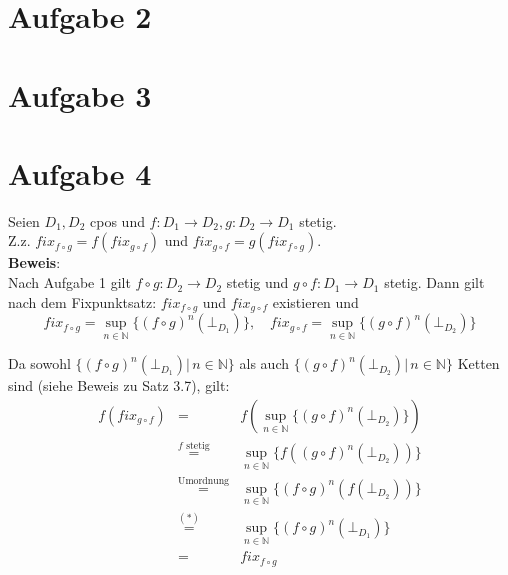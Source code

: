 \documentclass[11pt,a4paper,ngerman]{article}
\begin{document}

\section*{Aufgabe 2}



\section*{Aufgabe 3}



\section*{Aufgabe 4}
Seien $D_1, D_2$ cpos und $f: D_1 \to D_2, g: D_2 \to D_1$ stetig.\\
Z.z. $fix_{f\circ g} = f(fix_{g\circ f})$ und $fix_{g\circ f} = g(fix_{f\circ g})$.\\

\textbf{Beweis}:\\
Nach Aufgabe 1 gilt $f \circ g : D_2 \to D_2$ stetig und $g \circ f : D_1 \to D_1$ stetig. Dann gilt nach dem Fixpunktsatz: $fix_{f \circ g}$ und $fix_{g \circ f}$ existieren und
$$fix_{f \circ g} = \sup_{n \in \mathbb{N}} \{(f \circ g)^n(\bot_{D_1}) \}, \quad fix_{g \circ f} = \sup_{n \in \mathbb{N}} \{(g \circ f)^n(\bot_{D_2}) \}$$

Da sowohl $\{(f \circ g)^n(\bot_{D_1}) |\, n\in \mathbb{N}\}$ als auch $\{(g \circ f)^n(\bot_{D_2}) |\, n\in \mathbb{N}\}$ Ketten sind (siehe Beweis zu Satz 3.7), gilt:\\

\begin{eqnarray*}
f (fix_{g \circ f}) &=& f(\sup_{n \in \mathbb{N}} \{(g \circ f)^n(\bot_{D_2}) \}) \\
&\stackrel{f \text{ stetig}}{=}& \sup_{n \in \mathbb{N}} \{f((g \circ f)^n(\bot_{D_2})) \}\\
&\stackrel{\text{Umordnung}}{=}& \sup_{n \in \mathbb{N}} \{(f \circ g)^n(f(\bot_{D_2})) \}\\
&\stackrel{(*)}{=}& \sup_{n \in \mathbb{N}} \{(f \circ g)^n(\bot_{D_1}) \}\\
&=& fix_{f\circ g}
\end{eqnarray*}
\end{document}
